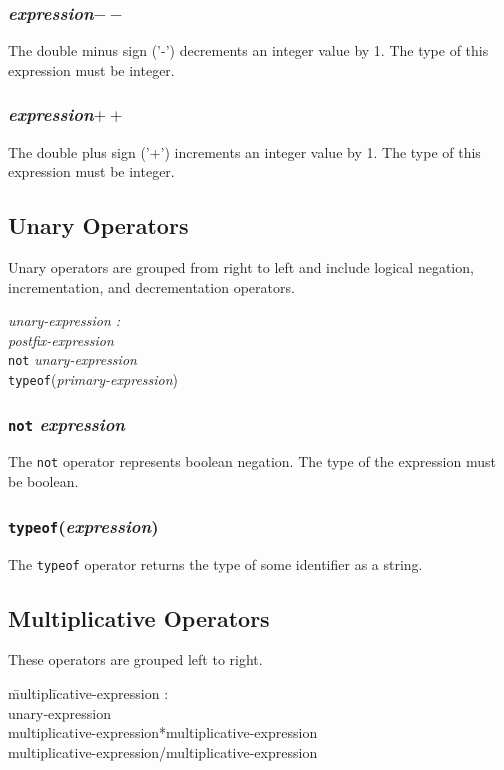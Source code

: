 \documentclass{article}
\begin{document}
\subsubsection{\emph{expression}$--$}
The double minus sign ('-') decrements an integer value by 1. The type of this expression must be integer.
\subsubsection{\emph{expression}$++$}
The double plus sign ('+') increments an integer value by 1. The type of this expression must be integer.

\subsection{Unary Operators}
Unary operators are grouped from right to left and include logical negation, incrementation, and decrementation operators.
\begin{tabbing}
	\= \emph{una}\=\emph{ry-expression :} \\
		\> \> \emph{postfix-expression} \\
		\>\> \texttt{not} \emph{unary-expression}\\
		\>\> \texttt{typeof}(\emph{primary-expression})
\end{tabbing}

\subsubsection{\texttt{not} \emph{expression}}
The \texttt{not} operator represents boolean negation. The type of the expression must be boolean.

\subsubsection{\texttt{typeof}(\emph{expression})}
The \texttt{typeof} operator returns the type of some identifier as a string.

\subsection{Multiplicative Operators}
These operators are grouped left to right.
\begin{itshape}
\begin{tabbing}
	\= multipl\=icative-expression : \\
		\>\> unary-expression \\		
		\>\> multiplicative-expression*multiplicative-expression \\
		\>\> multiplicative-expression/multiplicative-expression
\end{tabbing}
\end{itshape}
\end{document}
